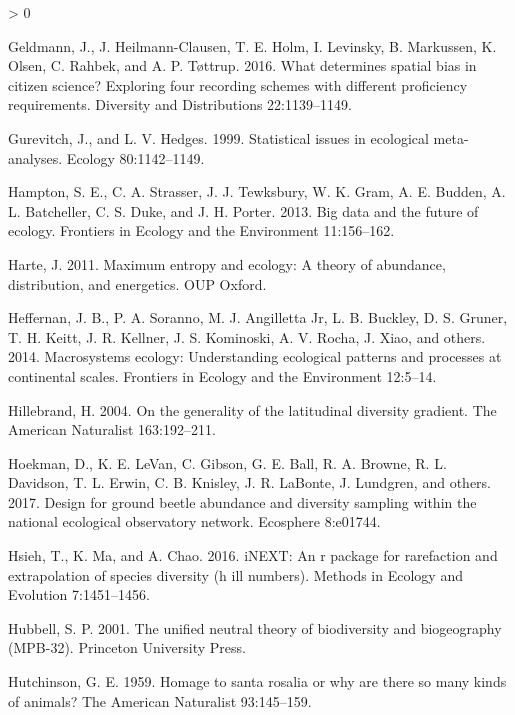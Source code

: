 \documentclass[
  12pt,
]{article}
\newlength{\cslhangindent}
\newenvironment{CSLReferences}[2] %
 {%
  \setlength{\parindent}{0pt}
  \ifodd #1 \everypar{\setlength{\hangindent}{\cslhangindent}}\ignorespaces\fi
  \ifnum #2 > 0
  \setlength{\parskip}{#2\baselineskip}
  \fi
 }%
 {}
\begin{document}
\begin{CSLReferences}{1}{0}
\leavevmode\hypertarget{ref-geldmann2016determines}{}%
Geldmann, J., J. Heilmann-Clausen, T. E. Holm, I. Levinsky, B. Markussen, K. Olsen, C. Rahbek, and A. P. Tøttrup. 2016. What determines spatial bias in citizen science? Exploring four recording schemes with different proficiency requirements. Diversity and Distributions 22:1139--1149.

\leavevmode\hypertarget{ref-gurevitch1999statistical}{}%
Gurevitch, J., and L. V. Hedges. 1999. Statistical issues in ecological meta-analyses. Ecology 80:1142--1149.

\leavevmode\hypertarget{ref-hampton2013big}{}%
Hampton, S. E., C. A. Strasser, J. J. Tewksbury, W. K. Gram, A. E. Budden, A. L. Batcheller, C. S. Duke, and J. H. Porter. 2013. Big data and the future of ecology. Frontiers in Ecology and the Environment 11:156--162.

\leavevmode\hypertarget{ref-harte2011maximum}{}%
Harte, J. 2011. Maximum entropy and ecology: A theory of abundance, distribution, and energetics. OUP Oxford.

\leavevmode\hypertarget{ref-heffernan2014macrosystems}{}%
Heffernan, J. B., P. A. Soranno, M. J. Angilletta Jr, L. B. Buckley, D. S. Gruner, T. H. Keitt, J. R. Kellner, J. S. Kominoski, A. V. Rocha, J. Xiao, and others. 2014. Macrosystems ecology: Understanding ecological patterns and processes at continental scales. Frontiers in Ecology and the Environment 12:5--14.

\leavevmode\hypertarget{ref-hillebrand2004generality}{}%
Hillebrand, H. 2004. On the generality of the latitudinal diversity gradient. The American Naturalist 163:192--211.

\leavevmode\hypertarget{ref-hoekman2017design}{}%
Hoekman, D., K. E. LeVan, C. Gibson, G. E. Ball, R. A. Browne, R. L. Davidson, T. L. Erwin, C. B. Knisley, J. R. LaBonte, J. Lundgren, and others. 2017. Design for ground beetle abundance and diversity sampling within the national ecological observatory network. Ecosphere 8:e01744.

\leavevmode\hypertarget{ref-hsieh2016inext}{}%
Hsieh, T., K. Ma, and A. Chao. 2016. iNEXT: An r package for rarefaction and extrapolation of species diversity (h ill numbers). Methods in Ecology and Evolution 7:1451--1456.

\leavevmode\hypertarget{ref-hubbell2001unified}{}%
Hubbell, S. P. 2001. The unified neutral theory of biodiversity and biogeography (MPB-32). Princeton University Press.

\leavevmode\hypertarget{ref-hutchinson1959homage}{}%
Hutchinson, G. E. 1959. Homage to santa rosalia or why are there so many kinds of animals? The American Naturalist 93:145--159.


\end{CSLReferences}
\end{document}
